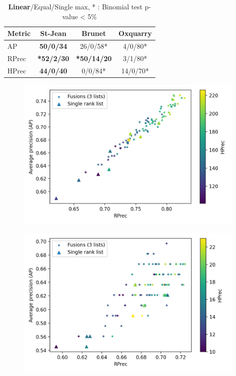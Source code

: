 \begin{table}[h]
  \caption{\textbf{Linear}/Equal/Single max,  * : Binomial test p-value < 5\%}
  \centering
  \label{}
  \begin{tabular}{l c c c}
    \toprule
    Metric& St-Jean  & Brunet & Oxquarry \\ \midrule
    AP    & \textbf{50/0/34} & 26/0/58* & 4/0/80* \\
    RPrec & \textbf{*52/2/30} & \textbf{*50/14/20} & 3/1/80* \\
    HPrec & \textbf{44/0/40} & 0/0/84* & 14/0/70* \\
    \bottomrule
  \end{tabular}
\end{table}

\begin{figure}
  \includegraphics[width=\linewidth]{img/fusion_st_jean.png}
  \caption{}
  \label{fig:fusion_st_jean}
\end{figure}
\begin{figure}
  \includegraphics[width=\linewidth]{img/fusion_brunet.png}
  \caption{}
  \label{fig:fusion_brunet}
\end{figure}
